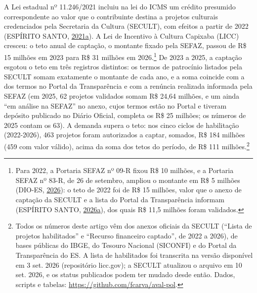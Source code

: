 \documentclass[12pt,a4paper]{article}
\begin{document}
A Lei estadual nº 11.246/2021 incluiu na lei do ICMS um crédito presumido correspondente ao valor
que o contribuinte destina a projetos culturais credenciados pela Secretaria da Cultura (SECULT),
com efeitos a partir de 2022 (ESPÍRITO SANTO, \hyperref[ref-espirito-12]{2021a}). A Lei de Incentivo
à Cultura Capixaba (LICC) cresceu: o teto anual de captação, o montante fixado pela SEFAZ, passou de
R\$ 15 milhões em 2023 para R\$ 31 milhões em 2026.\footnote{Para 2022, a Portaria SEFAZ nº 09-R
  fixou R\$ 10 milhões, e a Portaria SEFAZ nº 83-R, de 26 de setembro, ampliou o montante em R\$ 5
  milhões (DIO-ES, \hyperref[ref-dio-es-10]{2026}): o teto de 2022 foi de R\$ 15 milhões, valor que
  o anexo de captação da SECULT e a lista do Portal da Transparência informam (ESPÍRITO SANTO,
  \hyperref[ref-espirito-14]{2026a}), dos quais R\$ 11,5 milhões foram validados.} De 2023 a 2025, a
captação esgotou o teto em três registros distintos: os termos de patrocínio listados pela SECULT
somam exatamente o montante de cada ano, e a soma coincide com a dos termos no Portal da
Transparência e com a renúncia realizada informada pela SEFAZ (em 2025, 62 projetos validados somam
R\$ 24,64 milhões, e um ainda ``em análise na SEFAZ'' no anexo, cujos termos estão no Portal e
tiveram depósito publicado no Diário Oficial, completa os R\$ 25 milhões; os números de 2025 contam
os 63). A demanda supera o teto: nos cinco ciclos de habilitação (2022-2026), 463 projetos foram
autorizados a captar, somados, R\$ 184 milhões (459 com valor válido), acima da soma dos tetos do
período, de R\$ 111 milhões.\footnote{Todos os números deste artigo vêm dos anexos oficiais da
  SECULT (``Lista de projetos habilitados'' e ``Recurso financeiro captado'', de 2022 a 2026), de
  bases públicas do IBGE, do Tesouro Nacional (SICONFI) e do Portal da Transparência do ES. A lista
  de habilitados foi transcrita na versão disponível em 3 set. 2026 (repositório licc.gov); a SECULT
  atualizou o arquivo em 10 set. 2026, e os status publicados podem ter mudado desde então. Dados,
  scripts e tabelas: \url{https://github.com/fcarva/aval-pol}.}
\end{document}
